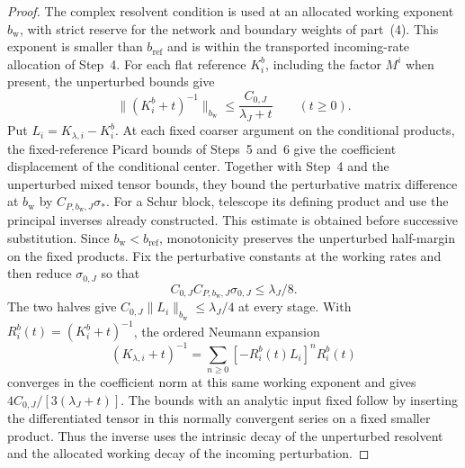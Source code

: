 \begin{proof}
The complex resolvent condition is used at an allocated working exponent $b_{\mathrm w}$, with strict reserve for the network and boundary weights of part~(4). This exponent is smaller than $b_{\mathrm{ref}}$ and is within the transported incoming-rate allocation of Step~4. For each flat reference $K_i^b$, including the factor $M^i$ when present, the unperturbed bounds give
\[
 \|(K_i^b+t)^{-1}\|_{b_{\mathrm w}}
       \le\frac{C_{0,J}}{\lambda_J+t}\qquad(t\ge0).
\]
Put $L_i=K_{\lambda,i}-K_i^b$. At each fixed coarser argument on the conditional products, the fixed-reference Picard bounds of Steps~5 and~6 give the coefficient displacement of the conditional center. Together with Step~4 and the unperturbed mixed tensor bounds, they bound the perturbative matrix difference at $b_{\mathrm w}$ by $C_{P,b_{\mathrm w},J}\sigma_*$. For a Schur block, telescope its defining product and use the principal inverses already constructed. This estimate is obtained before successive substitution. Since $b_{\mathrm w}<b_{\mathrm{ref}}$, monotonicity preserves the unperturbed half-margin on the fixed products. Fix the perturbative constants at the working rates and then reduce $\sigma_{0,J}$ so that
\[
 C_{0,J}C_{P,b_{\mathrm w},J}\sigma_{0,J}\le\lambda_J/8.
\]
The two halves give $C_{0,J}\|L_i\|_{b_{\mathrm w}}\le\lambda_J/4$ at every stage. With $R_i^b(t)=(K_i^b+t)^{-1}$, the ordered Neumann expansion
\[
 (K_{\lambda,i}+t)^{-1}
   =\sum_{n\ge0}[-R_i^b(t)L_i]^nR_i^b(t)
\]
converges in the coefficient norm at this same working exponent and gives $4C_{0,J}/[3(\lambda_J+t)]$. The bounds with an analytic input fixed follow by inserting the differentiated tensor in this normally convergent series on a fixed smaller product. Thus the inverse uses the intrinsic decay of the unperturbed resolvent and the allocated working decay of the incoming perturbation.


\end{proof}
